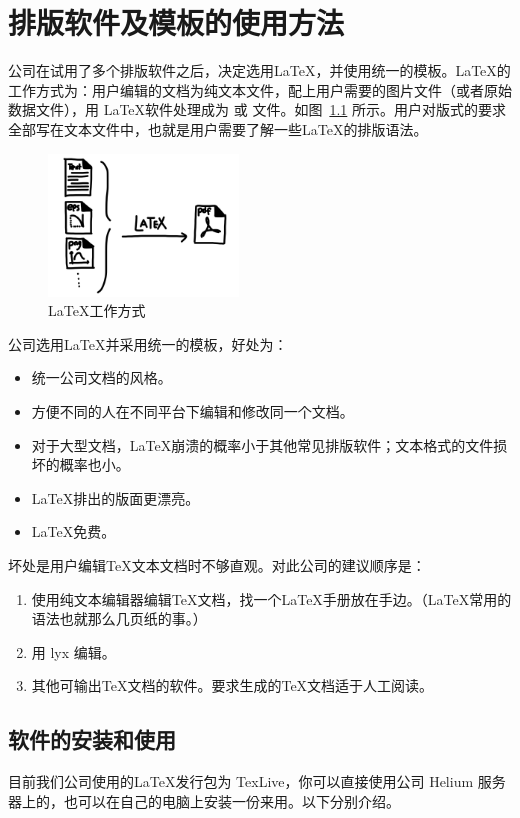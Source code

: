 \chapter{排版软件及模板的使用方法}
公司在试用了多个排版软件之后，决定选用\LaTeX ，并使用统一的模板。\LaTeX 的工作方式为：用户编辑的文档为纯文本文件，配上用户需要的图片文件（或者原始数据文件），用 \LaTeX 软件处理成为  或  文件。如图~\ref{latex} 所示。用户对版式的要求全部写在文本文件中，也就是用户需要了解一些\LaTeX 的排版语法。

\begin{figure}[htbp]\centering
\includegraphics[width=0.45\textwidth]{latex_wm.jpg} 
\caption{\label{latex}\LaTeX 工作方式}
\end{figure}

公司选用\LaTeX 并采用统一的模板，好处为：
\begin{itemize}
\item 统一公司文档的风格。
\item 方便不同的人在不同平台下编辑和修改同一个文档。
\item 对于大型文档，\LaTeX 崩溃的概率小于其他常见排版软件；文本格式的文件损坏的概率也小。
\item \LaTeX 排出的版面更漂亮。
\item \LaTeX 免费。
\end{itemize}
坏处是用户编辑\TeX 文本文档时不够直观。对此公司的建议顺序是：
\begin{enumerate}
\item 使用纯文本编辑器编辑\TeX 文档，找一个\LaTeX 手册放在手边。（\LaTeX 常用的语法也就那么几页纸的事\cite{oetiker1995not}。）
\item 用 lyx 编辑。
\item 其他可输出\TeX 文档的软件。要求生成的\TeX 文档适于人工阅读。
\end{enumerate}

\section{软件的安装和使用}
目前我们公司使用的\LaTeX 发行包为 TexLive，你可以直接使用公司 Helium 服务器上的，也可以在自己的电脑上安装一份来用。以下分别介绍。

